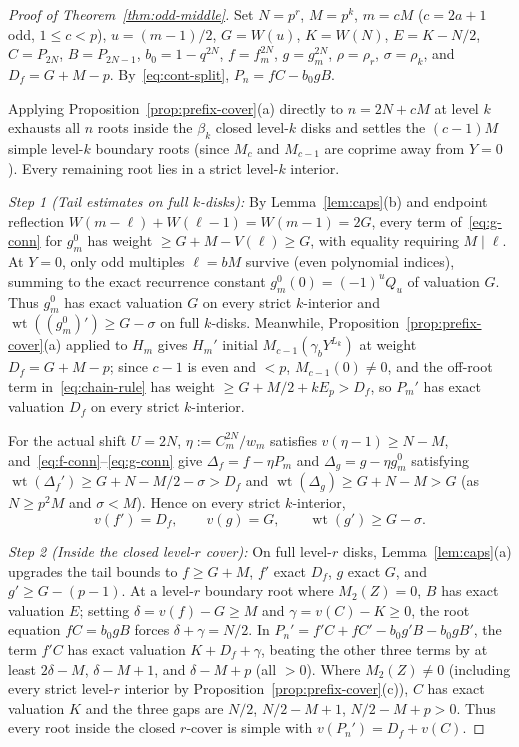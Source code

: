 \documentclass[11pt,reqno]{amsart}
\numberwithin{equation}{section}
\theoremstyle{definition}
\theoremstyle{remark}
\newcommand{\wt}{\operatorname{wt}}
\begin{document}
\begin{proof}[Proof of Theorem~\ref{thm:odd-middle}]
Set $N=p^r$, $M=p^k$, $m=cM$ ($c=2a+1$ odd, $1\le c<p$), $u=(m-1)/2$, $G=W(u)$, $K=W(N)$, $E=K-N/2$, $C=P_{2N}$, $B=P_{2N-1}$, $b_0=1-q^{2N}$, $f=f_m^{2N}$, $g=g_m^{2N}$, $\rho=\rho_r$, $\sigma=\rho_k$, and $D_f=G+M-p$. By~\eqref{eq:cont-split}, $P_n = fC - b_0 gB$.

Applying Proposition~\ref{prop:prefix-cover}(a) directly to $n=2N+cM$ at level $k$ exhausts all $n$ roots inside the $\beta_k$ closed level-$k$ disks and settles the $(c-1)M$ simple level-$k$ boundary roots (since $M_c$ and $M_{c-1}$ are coprime away from $Y=0$). Every remaining root lies in a strict level-$k$ interior.

\smallskip
\noindent\emph{Step 1 (Tail estimates on full $k$-disks):}
By Lemma~\ref{lem:caps}(b) and endpoint reflection $W(m-\ell)+W(\ell-1)=W(m-1)=2G$, every term of~\eqref{eq:g-conn} for $g_m^0$ has weight $\ge G+M-V(\ell)\ge G$, with equality requiring $M\mid \ell$. At $Y=0$, only odd multiples $\ell=bM$ survive (even polynomial indices), summing to the exact recurrence constant $g_m^0(0)=(-1)^u Q_u$ of valuation $G$. Thus $g_m^0$ has exact valuation $G$ on every strict $k$-interior and $\wt((g_m^0)')\ge G-\sigma$ on full $k$-disks. Meanwhile, Proposition~\ref{prop:prefix-cover}(a) applied to $H_m$ gives $H_m'$ initial $M_{c-1}(\gamma_b Y^{L_k})$ at weight $D_f=G+M-p$; since $c-1$ is even and $<p$, $M_{c-1}(0)\ne 0$, and the off-root term in~\eqref{eq:chain-rule} has weight $\ge G+M/2+kE_p > D_f$, so $P_m'$ has exact valuation $D_f$ on every strict $k$-interior.

For the actual shift $U=2N$, $\eta := C_m^{2N}/w_m$ satisfies $v(\eta-1)\ge N-M$, and~\eqref{eq:f-conn}--\eqref{eq:g-conn} give $\Delta_f = f - \eta P_m$ and $\Delta_g = g - \eta g_m^0$ satisfying $\wt(\Delta_f')\ge G+N-M/2-\sigma > D_f$ and $\wt(\Delta_g)\ge G+N-M > G$ (as $N\ge p^2 M$ and $\sigma < M$). Hence on every strict $k$-interior,
\[
v(f') = D_f,\qquad v(g) = G,\qquad \wt(g') \ge G-\sigma.
\]

\smallskip
\noindent\emph{Step 2 (Inside the closed level-$r$ cover):}
On full level-$r$ disks, Lemma~\ref{lem:caps}(a) upgrades the tail bounds to $f\ge G+M$, $f'$ exact $D_f$, $g$ exact $G$, and $g'\ge G-(p-1)$. At a level-$r$ boundary root where $M_2(Z)=0$, $B$ has exact valuation $E$; setting $\delta=v(f)-G\ge M$ and $\gamma=v(C)-K\ge 0$, the root equation $fC=b_0 gB$ forces $\delta+\gamma=N/2$. In $P_n'=f'C+fC'-b_0 g'B-b_0 gB'$, the term $f'C$ has exact valuation $K+D_f+\gamma$, beating the other three terms by at least $2\delta-M$, $\delta-M+1$, and $\delta-M+p$ (all $>0$). Where $M_2(Z)\ne 0$ (including every strict level-$r$ interior by Proposition~\ref{prop:prefix-cover}(c)), $C$ has exact valuation $K$ and the three gaps are $N/2$, $N/2-M+1$, $N/2-M+p > 0$. Thus every root inside the closed $r$-cover is simple with $v(P_n') = D_f + v(C)$.


\end{proof}
\end{document}
